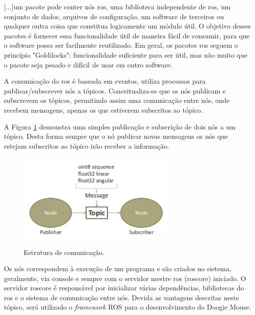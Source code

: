 \begin{quoting}[rightmargin=0cm,leftmargin=4cm]
	\begin{singlespace}
		{\footnotesize
			[...]um pacote pode conter nós \gls*{ros}, uma biblioteca independente de \gls*{ros}, um conjunto de dados, arquivos de configuração, um software de terceiros ou qualquer outra coisa que constitua logicamente um módulo útil. O objetivo desses pacotes é fornecer essa funcionalidade útil de maneira fácil de consumir, para que o software possa ser facilmente reutilizado. Em geral, os pacotes \gls*{ros} seguem o princípio "Goldilocks": funcionalidade suficiente para ser útil, mas não muito que o pacote seja pesado e difícil de usar em outro software. \cite[tradução nossa]{rospackages}
		}
	\end{singlespace}
\end{quoting}


A comunicação do \gls*{ros} é baseada em eventos, utiliza processos para publicar/subscrever nós a tópicos. Conceitualiza-se que os nós publicam e subscrevem os tópicos, permitindo assim uma comunicação entre nós, onde recebem mensagens, apenas os que estiverem subscritos ao tópico.

A Figura \ref{fig:estrutura_comunicacao_ros} demonstra uma simples publicação e subscrição de dois nós a um tópico. Desta forma sempre que o nó publicar novas mensagens os nós que estejam subscritos ao tópico irão receber a informação.

\begin{figure}[H]
	\centering
	\caption{Estrutura de comunicação.}
	\includegraphics[width=0.7\textwidth]
	{Figures/estrutura_comunicacao_ros}
	\label{fig:estrutura_comunicacao_ros}
\end{figure}

Os nós correspondem à execução de um programa e são criados no sistema, geralmente, via console e sempre com o servidor mestre \gls*{ros} (roscore) iniciado. O servidor roscore é responsável por inicializar várias dependências, bibliotecas do \gls*{ros} e o sistema de comunicação entre nós. Devida as vantagens descritas neste tópico, será utilizado o \textit{framework} ROS para o desenvolvimento do Doogie Mouse.
